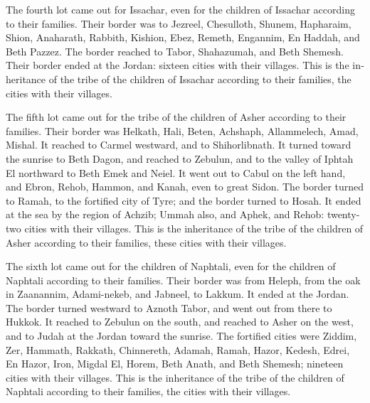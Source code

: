 \begin{paracol}{2}
\begin{otherlanguage}{english}
 The fourth lot came out for Issachar, even for the
children of Issachar according to their families.  Their
border was to Jezreel, Chesulloth, Shunem,  Hapharaim,
Shion, Anaharath,  Rabbith, Kishion, Ebez,
 Remeth, Engannim, En Haddah, and Beth Pazzez.
 The border reached to Tabor, Shahazumah, and Beth
Shemesh. Their border ended at the Jordan: sixteen cities with their
villages.  This is the inheritance of the tribe of the
children of Issachar according to their families, the cities with their
villages.

 The fifth lot came out for the tribe of the children of
Asher according to their families.  Their border was
Helkath, Hali, Beten, Achshaph,  Allammelech, Amad,
Mishal. It reached to Carmel westward, and to Shihorlibnath.
 It turned toward the sunrise to Beth Dagon, and reached
to Zebulun, and to the valley of Iphtah El northward to Beth Emek and
Neiel. It went out to Cabul on the left hand,  and Ebron,
Rehob, Hammon, and Kanah, even to great Sidon.  The
border turned to Ramah, to the fortified city of Tyre; and the border
turned to Hosah. It ended at the sea by the region of Achzib;
 Ummah also, and Aphek, and Rehob: twenty-two cities with
their villages.  This is the inheritance of the tribe of
the children of Asher according to their families, these cities with
their villages.

 The sixth lot came out for the children of Naphtali,
even for the children of Naphtali according to their families.
 Their border was from Heleph, from the oak in Zaanannim,
Adami-nekeb, and Jabneel, to Lakkum. It ended at the Jordan.
 The border turned westward to Aznoth Tabor, and went out
from there to Hukkok. It reached to Zebulun on the south, and reached to
Asher on the west, and to Judah at the Jordan toward the sunrise.
 The fortified cities were Ziddim, Zer, Hammath, Rakkath,
Chinnereth,  Adamah, Ramah, Hazor, 
Kedesh, Edrei, En Hazor,  Iron, Migdal El, Horem, Beth
Anath, and Beth Shemesh; nineteen cities with their villages.
 This is the inheritance of the tribe of the children of
Naphtali according to their families, the cities with their villages.


\end{otherlanguage}
\end{paracol}

